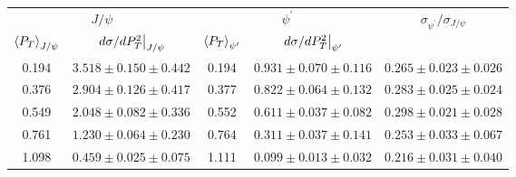 \begin{tabular}{cc|cc|c}
\hline
\multicolumn{2}{c|}{$J/\psi$} &
  \multicolumn{2}{c|}{$\psi^{\prime}$} &
  \multirow{2}{*}{$\sigma_{\psi^\prime}/\sigma_{J/\psi}$} \\ \cline{1-4}
$\expval{P_T}_{J/\psi}$ &
  $\eval{d\sigma/dP^2_T}_{J/\psi}$ &
  $\expval{P_T}_{\psi^\prime}$ &
  $\eval{d\sigma/dP^2_T}_{\psi^\prime}$ &
   \\ \hline
0.194 & $3.518\pm0.150\pm0.442$ & 0.194 & $0.931\pm0.070\pm0.116$ & $0.265\pm0.023\pm0.026$ \\
0.376 & $2.904\pm0.126\pm0.417$ & 0.377 & $0.822\pm0.064\pm0.132$ & $0.283\pm0.025\pm0.024$ \\
0.549 & $2.048\pm0.082\pm0.336$ & 0.552 & $0.611\pm0.037\pm0.082$ & $0.298\pm0.021\pm0.028$ \\
0.761 & $1.230\pm0.064\pm0.230$ & 0.764 & $0.311\pm0.037\pm0.141$ & $0.253\pm0.033\pm0.067$ \\
1.098 & $0.459\pm0.025\pm0.075$ & 1.111 & $0.099\pm0.013\pm0.032$ & $0.216\pm0.031\pm0.040$ \\ \hline
\end{tabular}
